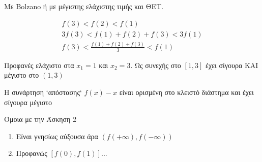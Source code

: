 \documentclass{presentation}
\begin{document}
\begin{lisi}
  Με Bolzano ή με μέγιστης ελάχιστης τιμής και ΘΕΤ.

  \begin{gather*}
    f(3)<f(2)<f(1) \\
    3f(3)<f(1)+f(2)+f(3)<3f(1) \\
    f(3)<\frac{f(1)+f(2)+f(3)}{3}<f(1)
  \end{gather*}

  \hyperlink{Άσκηση2}{}
\end{lisi}

\begin{lisi}
  Προφανές ελάχιστο στα $x_1=1$ και $x_2=3$. Ως συνεχής στο $[1,3]$ έχει σίγουρα ΚΑΙ μέγιστο στο $(1,3)$

  \hyperlink{Άσκηση3}{}
\end{lisi}

\begin{lisi}
  Η συνάρτηση `απόστασης` $f(x)-x$ είναι ορισμένη στο κλειστό διάστημα και έχει σίγουρα μέγιστο

  \hyperlink{Άσκηση4}{}
\end{lisi}

\begin{lisi}
  Όμοια με την Άσκηση 2

  \hyperlink{Άσκηση5}{}
\end{lisi}

\begin{lisi}
  \begin{enumerate}
    \item Είναι γνησίως αύξουσα άρα $(f(+\infty),f(-\infty))$
    \item Προφανώς $[f(0),f(1)]$...
  \end{enumerate}

  \hyperlink{Άσκηση6}{}
\end{lisi}
\end{document}
